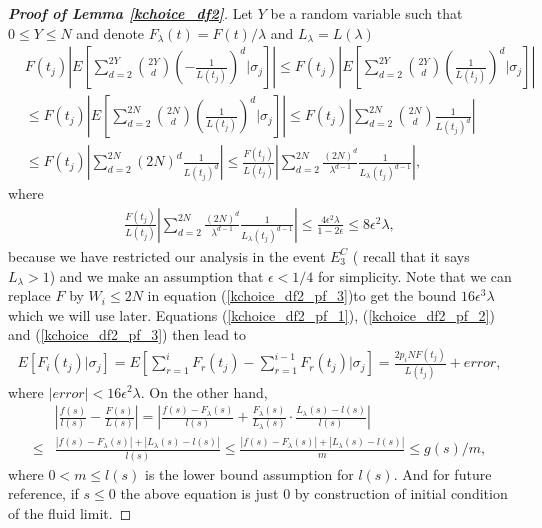 \documentclass[12pt]{article}
\numberwithin{equation}{section}  %
\begin{document}
\begin{proof}[\textbf{Proof of Lemma \ref{kchoice_df2}}]
Let $Y$ be a random variable such that $0\leq Y\leq N$ and denote $F_\lambda(t)=F(t)/\lambda$ and $L_\lambda=L(\lambda)$
\begin{align}
&F(t_j)\left|E\left[\sum_{d=2}^{2Y}{2Y \choose d}(-\frac{1}{L(t_j)})^d|\sigma_{j}\right]\right|  
\leq F(t_j)\left|E\left[\sum_{d=2}^{2Y}{2Y \choose d}(\frac{1}{L(t_j)})^d|\sigma_{j}\right]\right|\nonumber\\
&\leq F(t_j)\left|E\left[\sum_{d=2}^{2N}{2N \choose d}(\frac{1}{L(t_j)})^d|\sigma_{j}\right]\right|
\leq F(t_j)\left|\sum_{d=2}^{2N}{2N \choose d}\frac{1}{L(t_j)^d}\right|\nonumber\\
&\leq F(t_j)\left|\sum_{d=2}^{2N}(2N)^d\frac{1}{L(t_j)^d}\right|
\leq \frac{F(t_j)}{L(t_j)}\left |\sum_{d=2}^{2N}\frac{(2N)^d}{\lambda^{d-1}}\frac{1}{L_\lambda(t_j)^{d-1}}\right|\label{kchoice_df2_pf_2},
\end{align} 
where 
\begin{align}
\frac{F(t_j)}{L(t_j)}\left |\sum_{d=2}^{2N}\frac{(2N)^d}{\lambda^{d-1}}\frac{1}{L_\lambda(t_j)^{d-1}}\right|\leq\frac{4\epsilon^2\lambda}{1-2\epsilon}
\leq 8\epsilon^2\lambda\label{kchoice_df2_pf_3},
\end{align}
because we have restricted our analysis in the event $E_3^C$ ( recall that it says $L_\lambda>1$) and we make an assumption that $\epsilon<1/4$ for simplicity. Note that we can replace $F$ by $W_{i}\leq 2N$ in equation (\ref{kchoice_df2_pf_3})to get the bound $16\epsilon^3\lambda$ which we will use later. Equations (\ref{kchoice_df2_pf_1}), (\ref{kchoice_df2_pf_2}) and (\ref{kchoice_df2_pf_3}) then lead to
\begin{align}
E[F_i(t_j)|\sigma_j]=E\left[\sum_{r=1}^{i}F_r(t_j)-\sum_{r=1}^{i-1}F_r(t_j)\Big|\sigma_{j}\right]
=\frac{2p_iNF(t_j)}{L(t_j)}+error\label{kchoice_df2_pf_4},
\end{align}
where $|error|<16\epsilon^2\lambda$. On the other hand,
\begin{align}
&\left|\frac{f(s)}{l(s)}-\frac{F(s)}{L(s)}\right|=\left|\frac{f(s)-F_\lambda(s)}{l(s)}+\frac{F_\lambda(s)}{L_\lambda(s)}\cdot\frac{L_\lambda(s)-l(s)}{l(s)}\right|\nonumber\\
\leq&\frac{|f(s)-F_\lambda(s)|+|L_\lambda(s)-l(s)|}{l(s)}\leq\frac{|f(s)-F_\lambda(s)|+|L_\lambda(s)-l(s)|}{m}\leq g(s)/m\label{kchoice_df2_pf_5},
\end{align}
where $0<m\leq l(s)$ is the lower bound assumption for $l(s)$. And for future reference, if $s\leq 0$ the above equation is just 0 by construction of initial condition of the fluid limit. 


\end{proof}
\end{document}
